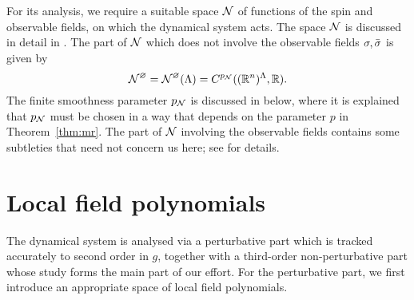 
For its analysis, we require
a suitable space $\mathcal{N}$ of functions of the spin
and observable fields, on which the dynamical system acts.  The space $\mathcal{N}$ is
discussed in detail in \cite[Section~\ref{phi4-sec:phi4observables_representation}]{ST-phi4}.
The part of $\mathcal{N}$ which does not involve the observable fields $\sigma,\bar{\sigma}$ is
given by
\begin{equation}
\label{e:Ncaldef}
    \mathcal{N}^\varnothing = \mathcal{N}^\varnothing(\Lambda) = C^{p_{\mathcal{N}}}(({\mathbb R}^n)^\Lambda,{\mathbb R}).
\end{equation}
The finite smoothness parameter $p_{\mathcal{N}}$ is discussed in \REF %
below,
where it is explained that $p_{\mathcal{N}}$ must be chosen in a way that depends on the
parameter $p$ in Theorem~\ref{thm:mr}.
The part of $\mathcal{N}$ involving the observable fields contains some subtleties that
need not concern us here; see \cite[Section~\ref{phi4-sec:phi4observables_representation}]{ST-phi4}
for details.

\section{Local field polynomials}

The dynamical system is analysed via a perturbative part which is tracked accurately
to second order in $g$, together with a third-order non-perturbative part whose study
forms the main part of our effort.  For the perturbative part, we first introduce
an appropriate space of local field polynomials.

